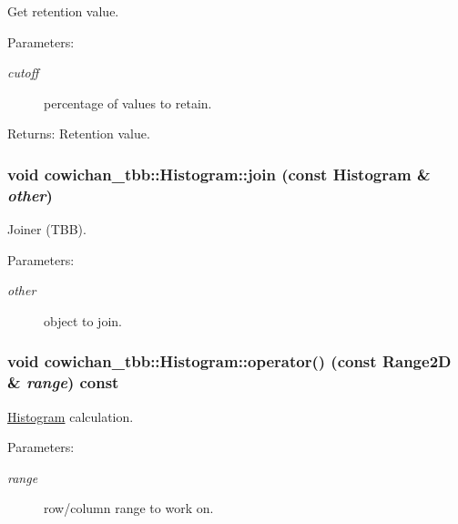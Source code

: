 Get retention value. \begin{Desc}
\item[Parameters:]
\begin{description}
\item[{\em cutoff}]percentage of values to retain. \end{description}
\end{Desc}
\begin{Desc}
\item[Returns:]Retention value. \end{Desc}
\hypertarget{classcowichan__tbb_1_1_histogram_6be59f34ceb9be23e8f8f9e952a5bfc5}{
\subsubsection[{join}]{\setlength{\rightskip}{0pt plus 5cm}void cowichan\_\-tbb::Histogram::join (const {\bf Histogram} \& {\em other})}}
\label{classcowichan__tbb_1_1_histogram_6be59f34ceb9be23e8f8f9e952a5bfc5}


Joiner (TBB). \begin{Desc}
\item[Parameters:]
\begin{description}
\item[{\em other}]object to join. \end{description}
\end{Desc}
\hypertarget{classcowichan__tbb_1_1_histogram_eafa033db597cbe0e7d23f49ca628c85}{
\subsubsection[{operator()}]{\setlength{\rightskip}{0pt plus 5cm}void cowichan\_\-tbb::Histogram::operator() (const {\bf Range2D} \& {\em range}) const}}
\label{classcowichan__tbb_1_1_histogram_eafa033db597cbe0e7d23f49ca628c85}


\hyperlink{classcowichan__tbb_1_1_histogram}{Histogram} calculation. \begin{Desc}
\item[Parameters:]
\begin{description}
\item[{\em range}]row/column range to work on. \end{description}
\end{Desc}


